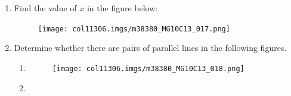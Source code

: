 \begin{table}[H]
\begin{enumerate}[noitemsep,
label=\textbf{\arabic*}. ]
\begin{figure}[H]
 \end{figure}   

    \addtocounter{footnote}{-0}
\pagebreak
            \item Find the value of \begin{math}x\end{math} in the figure below:

    \setcounter{subfigure}{0}


	\begin{figure}[H] %
    \begin{center}
   
\label{m38380*id317330!!!underscore!!!media}\label{
m38380*id317330!!!underscore!!!printimage}\texttt{[image: 
col11306.imgs/m38380\_MG10C13\_017.png]} %
        
      \vspace{2pt}
    \vspace{.1in}
    
    \end{center}

 \end{figure}   

    \addtocounter{footnote}{-0}
            \item  Determine whether there are pairs of parallel lines in the
following figures.
\label{m38380*id79123}\begin{enumerate}[noitemsep, label=\textbf{\alph*}. ] 
            \item 

    \setcounter{subfigure}{0}


	\begin{figure}[H] %
    \begin{center}
   
\label{m38380*id317353!!!underscore!!!media}\label{
m38380*id317353!!!underscore!!!printimage}\texttt{[image: 
col11306.imgs/m38380\_MG10C13\_018.png]} %
        
      \vspace{2pt}
    \vspace{.1in}
    
    \end{center}

 \end{figure}   

    \addtocounter{footnote}{-0}
    
\item 


\end{enumerate}
\end{enumerate}
\end{table}
